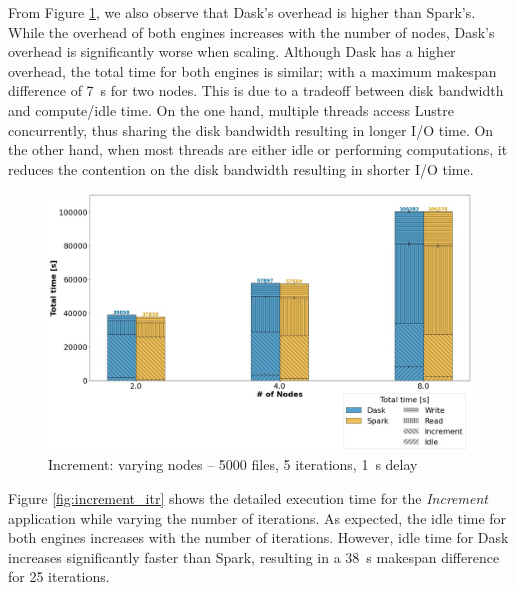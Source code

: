 \documentclass[conference]{IEEEtran}
\begin{document}
From Figure \ref{fig:increment_worker}, we also observe that Dask's overhead is higher than Spark's.
While the overhead of both engines increases with the number of nodes, Dask's overhead is significantly worse when scaling.
Although Dask has a higher overhead, the total time for both engines is similar; with a maximum makespan difference of \SI{7}{\second} for two nodes.
This is due to a tradeoff between disk bandwidth and compute/idle time.
On the one hand, multiple threads access Lustre concurrently, thus sharing the disk bandwidth resulting in longer I/O time.
On the other hand, when most threads are either idle or performing computations, it reduces the contention on the disk bandwidth resulting in shorter I/O time.
\begin{figure}[!t]
	\centering
	\includegraphics[clip,width=\columnwidth]{figures/stacked_increment_worker.jpg}
	\caption{Increment: varying nodes -- 5000 files, 5 iterations, \SI{1}{\second} delay}
	\label{fig:increment_worker}
\end{figure}
		
Figure \ref{fig:increment_itr} shows the detailed execution time for the \textit{Increment} application while varying the number of iterations.
As expected, the idle time for both engines increases with the number of iterations.
However, idle time for Dask increases significantly faster than Spark, resulting in a \SI{38}{\second} makespan difference for 25 iterations.
		
\end{document}

